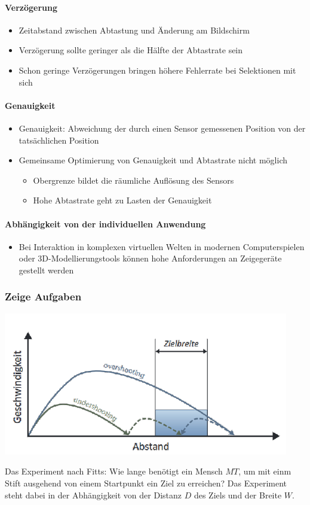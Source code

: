 \documentclass
[
	8pt,		%
	ngerman,	%
	a4paper,	%
	landscape,	%
	final		%
]{extarticle}
\begin{document}
\begin{multicols*}{4}
	\paragraph{Verzögerung}
	\begin{itemize}
		\item Zeitabstand zwischen Abtastung und Änderung am Bildschirm
		\item Verzögerung sollte geringer als die Hälfte der Abtastrate sein
		\item Schon geringe Verzögerungen bringen höhere Fehlerrate bei
		      Selektionen mit sich
	\end{itemize}
	\paragraph{Genauigkeit}
	\begin{itemize}
		\item Genauigkeit: Abweichung der durch einen Sensor gemessenen Position
		      von der tatsächlichen Position
		\item Gemeinsame Optimierung von Genauigkeit und Abtastrate nicht
		      möglich
		      \begin{itemize}[nolistsep]
			      \item Obergrenze bildet die räumliche Auflösung des Sensors
			      \item Hohe Abtastrate geht zu Lasten der Genauigkeit
		      \end{itemize}
	\end{itemize}
	\paragraph{Abhängigkeit von der individuellen Anwendung}
	\begin{itemize}
		\item Bei Interaktion in komplexen virtuellen Welten in modernen
		      Computerspielen oder 3D-Modellierungstools können hohe
		      Anforderungen an Zeigegeräte gestellt werden
	\end{itemize}
	\subsubsection{Zeige Aufgaben}
	\begin{center}
		\includegraphics[width=0.7\linewidth]{./Documents/Graphics/TargetSelectionTask.png}
	\end{center}
	Das Experiment nach Fitts: Wie lange benötigt ein Mensch \(MT\), um mit einm
	Stift ausgehend von einem Startpunkt ein Ziel zu erreichen? Das Experiment
	steht dabei in der Abhängigkeit von der Distanz \(D\) des Ziels und der
	Breite \(W\).

\end{multicols*}
\end{document}
